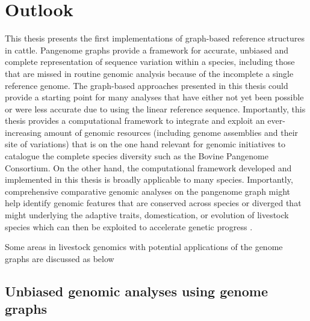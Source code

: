 \documentclass[../main.tex]{subfiles}
\begin{document}
\newpage

\section*{\LARGE{Outlook}}
{}
\thispagestyle{plain}

This thesis presents the first implementations of graph-based reference structures in cattle. Pangenome graphs provide a framework for accurate, unbiased and complete representation of sequence variation within a species, including those that are missed in routine genomic analysis because of the incomplete a single reference genome. The graph-based approaches presented in this thesis could provide a starting point for many analyses that have either not yet been possible or were less accurate due to using the linear reference sequence. Importantly, this thesis provides a computational framework to integrate and exploit an ever-increasing amount of genomic resources (including genome assemblies and their site of variations) that is on the one hand relevant for genomic initiatives to catalogue the complete species diversity such as the Bovine Pangenome Consortium. On the other hand, the computational framework developed and implemented in this thesis is broadly applicable to many species. Importantly, comprehensive comparative genomic analyses on the pangenome graph might help identify genomic features that are conserved across species or diverged that might underlying the adaptive traits, domestication, or evolution of livestock species which can then be exploited to accelerate genetic progress \citep{foissac2019multi,clark2020faang}. 

Some areas in livestock genomics with potential applications of the genome graphs are discussed as below

\subsection*{Unbiased genomic analyses using genome graphs}
\end{document}
